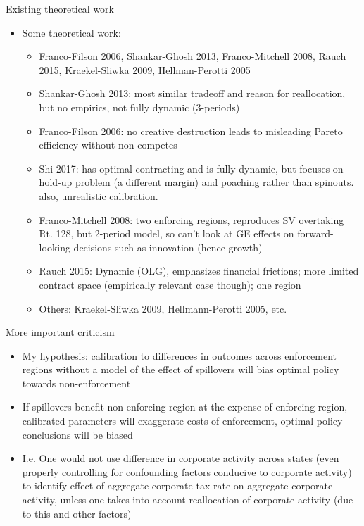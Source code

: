 \begin{frame}{Existing theoretical work}
\begin{itemize}
	\small 
	\item Some theoretical work:
	\begin{itemize}
		\item Franco-Filson 2006, Shankar-Ghosh 2013, Franco-Mitchell 2008, Rauch 2015, Kraekel-Sliwka 2009, Hellman-Perotti 2005 
		\item Shankar-Ghosh 2013: most similar tradeoff and reason for reallocation, but no empirics, not fully dynamic (3-periods)
		\item Franco-Filson 2006: no creative destruction leads to misleading Pareto efficiency without non-competes
		\item Shi 2017: has optimal contracting and is fully dynamic, but focuses on hold-up problem (a different margin) and poaching rather than spinouts. also, unrealistic calibration.
		\item Franco-Mitchell 2008: two enforcing regions, reproduces SV overtaking Rt. 128, but 2-period model, so can't look at GE effects on forward-looking decisions such as innovation (hence growth)
		\item Rauch 2015: Dynamic (OLG), emphasizes financial frictions; more limited contract space (empirically relevant case though); one region
		\item Others: Kraekel-Sliwka 2009, Hellmann-Perotti 2005, etc.
	\end{itemize}
\end{itemize}
\end{frame}

\begin{frame}{More important criticism}
\begin{itemize}
	\item My hypothesis: calibration to differences in outcomes across enforcement regions without a model of the effect of spillovers will bias optimal policy towards non-enforcement
	\item If spillovers benefit non-enforcing region at the expense of enforcing region, calibrated parameters will exaggerate costs of enforcement, optimal policy conclusions will be biased
	\item I.e. One would not use difference in corporate activity across states (even properly controlling for confounding factors conducive to corporate activity) to identify effect of aggregate corporate tax rate on aggregate corporate activity, unless one takes into account reallocation of corporate activity (due to this and other factors)
\end{itemize}
\end{frame}

